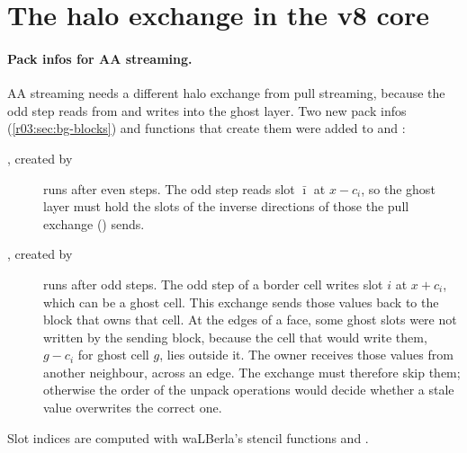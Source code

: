 \section{The halo exchange in the v8 core}\label{r03:sec:wl-halo}

\paragraph{Pack infos for AA streaming.} AA streaming needs a different halo exchange from
pull streaming, because the odd step reads from and writes into the ghost layer. Two new pack
infos (\cref{r03:sec:bg-blocks}) and functions that create them were added to
 and
:
\begin{description}
  \item[, created by ] runs
        after even steps. The odd step reads slot $\bar\imath$ at $x - c_i$, so the ghost layer
        must hold the slots of the inverse directions of those the pull exchange
        () sends.
  \item[, created by ] runs
        after odd steps. The odd step of a border cell writes slot $i$ at $x + c_i$, which can be
        a ghost cell. This exchange sends those values back to the block that owns that cell.
        At the edges of a face, some ghost slots were not written by the sending block, because
        the cell that would write them, $g - c_i$ for ghost cell $g$, lies outside it. The owner
        receives those values from another neighbour, across an edge. The exchange must
        therefore skip them; otherwise the order of the unpack operations would decide whether a
        stale value overwrites the correct one.
\end{description}
Slot indices are computed with waLBerla's stencil functions  and
.

